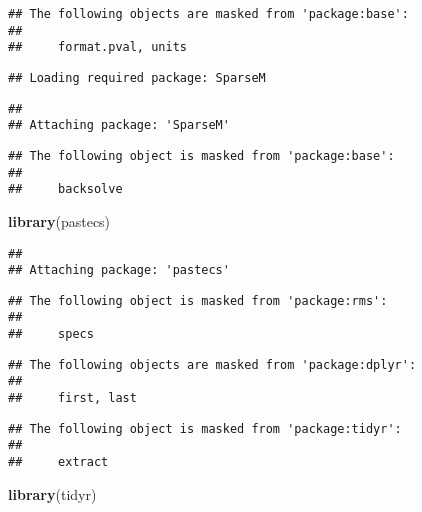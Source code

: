 \documentclass[]{article}
\newenvironment{Shaded}{\begin{snugshade}}{\end{snugshade}}
\newcommand{\KeywordTok}[1]{\textcolor[rgb]{0.13,0.29,0.53}{\textbf{#1}}}
\newcommand{\DataTypeTok}[1]{\textcolor[rgb]{0.13,0.29,0.53}{#1}}
\newcommand{\StringTok}[1]{\textcolor[rgb]{0.31,0.60,0.02}{#1}}
\newcommand{\OperatorTok}[1]{\textcolor[rgb]{0.81,0.36,0.00}{\textbf{#1}}}
\newcommand{\NormalTok}[1]{#1}
\begin{document}
\begin{verbatim}
## The following objects are masked from 'package:base':
## 
##     format.pval, units
\end{verbatim}

\begin{verbatim}
## Loading required package: SparseM
\end{verbatim}

\begin{verbatim}
## 
## Attaching package: 'SparseM'
\end{verbatim}

\begin{verbatim}
## The following object is masked from 'package:base':
## 
##     backsolve
\end{verbatim}

\begin{Shaded}
\begin{Highlighting}[]
\KeywordTok{library}\NormalTok{(pastecs)}
\end{Highlighting}
\end{Shaded}

\begin{verbatim}
## 
## Attaching package: 'pastecs'
\end{verbatim}

\begin{verbatim}
## The following object is masked from 'package:rms':
## 
##     specs
\end{verbatim}

\begin{verbatim}
## The following objects are masked from 'package:dplyr':
## 
##     first, last
\end{verbatim}

\begin{verbatim}
## The following object is masked from 'package:tidyr':
## 
##     extract
\end{verbatim}

\begin{Shaded}
\begin{Highlighting}[]
\KeywordTok{library}\NormalTok{(tidyr)}
\end{Highlighting}
\end{Shaded}

\begin{Shaded}
\end{Shaded}
\end{document}
